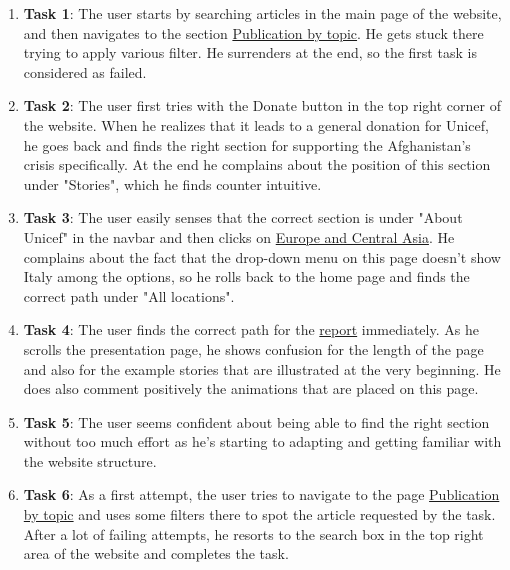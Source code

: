 \begin{enumerate}
	\item \textbf{Task 1}: The user starts by searching articles in the main page of the website, and then navigates to the section \href{https://www.unicef.org/reports}{Publication by topic}. He gets stuck there trying to apply various filter. He surrenders at the end, so the first task is considered as failed.
	\item \textbf{Task 2}: The user first tries with the Donate button in the top right corner of the website. When he realizes that it leads to a general donation for Unicef, he goes back and finds the right section for supporting the Afghanistan's crisis specifically. At the end he complains about the position of this section under "Stories", which he finds counter intuitive.
	\item \textbf{Task 3}: The user easily senses that the correct section is under "About Unicef" in the navbar and then clicks on \href{https://www.unicef.org/where-we-work#europe-and-central-asia}{Europe and Central Asia}. He complains about the fact that the drop-down menu on this page doesn't show Italy among the options, so he rolls back to the home page and finds the correct path under "All locations".
	\item \textbf{Task 4}: The user finds the correct path for the \href{https://www.unicef.org/reports/state-of-worlds-children}{report} immediately. As he scrolls the presentation page, he shows confusion for the length of the page and also for the example stories that are illustrated at the very beginning. He does also comment positively the animations that are placed on this page. 
	\item \textbf{Task 5}: The user seems confident about being able to find the right section without too much effort as he's starting to adapting and getting familiar with the website structure. 
	\item \textbf{Task 6}: As a first attempt, the user tries to navigate to the page \href{https://www.unicef.org/reports}{Publication by topic} and uses some filters there to spot the article requested by the task. After a lot of failing attempts, he resorts to the search box in the top right area of the website and completes the task.
	
\end{enumerate}





\vspace{1cm}

